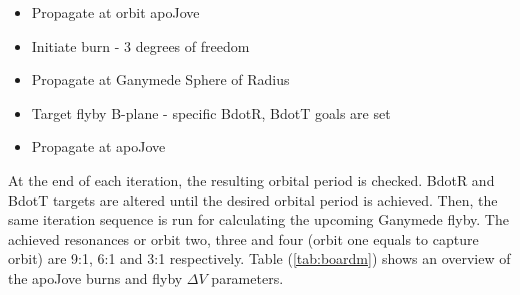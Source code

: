 \begin{itemize}
  \item Propagate at orbit apoJove
  \item Initiate burn - 3 degrees of freedom
  \item Propagate at Ganymede Sphere of Radius
  \item Target flyby B-plane - specific BdotR, BdotT goals are set
  \item Propagate at apoJove
\end{itemize}

At the end of each iteration, the resulting orbital period is checked. BdotR and BdotT targets are altered until the desired orbital period is achieved. Then, the same iteration sequence is run for calculating the upcoming Ganymede flyby. The achieved resonances or orbit two, three and four (orbit one equals to capture orbit) are 9:1, 6:1 and 3:1 respectively. 
Table (\ref{tab:boardm}) shows an overview of the apoJove burns and flyby $\Delta V$ parameters.

